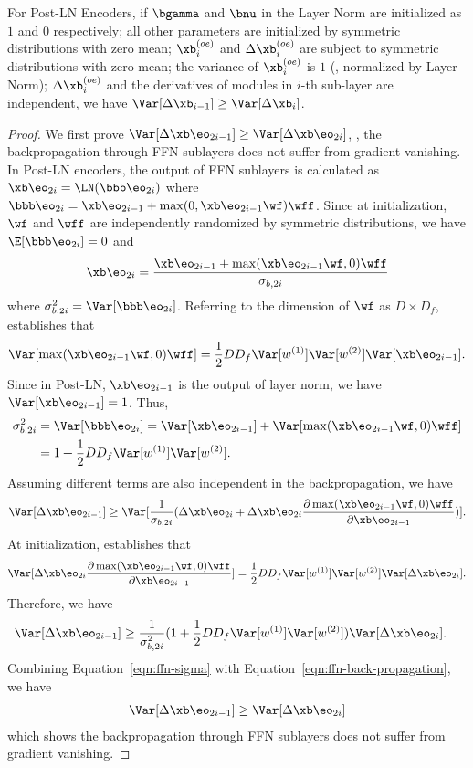 \begin{theorem}
For Post-LN Encoders, if $\bgamma$ and $\bnu$ in the Layer Norm are initialized as $1$ and $0$ respectively; all other parameters are initialized by symmetric distributions with zero mean; $\xb_{i}^{(oe)}$ and $\Delta \xb_i^{(oe)}$ are subject to symmetric distributions with zero mean; the variance of $\xb_{i}^{(oe)}$ is $1$ (\ie, normalized by Layer Norm); $\Delta \xb_i^{(oe)}$ and the derivatives of modules in $i$-th sub-layer are independent, we have $\Var[\Delta \xb_{i-1}] \geq \Var[\Delta \xb_{i}]$.
\end{theorem}
\begin{proof}
We first prove $\Var[\Delta \xb\eo_{2i-1}] \geq \Var[\Delta \xb\eo_{2i}]$, \ie, the backpropagation through FFN sublayers does not suffer from gradient vanishing. 
In Post-LN encoders, the output of FFN sublayers is calculated as $\xb\eo_{2i} = \LN(\bbb\eo_{2i})$ where $\bbb\eo_{2i} =
\xb\eo_{2i-1} + \max(0, \xb\eo_{2i-1}\wf)\wff$.
Since at initialization, $\wf$ and $\wff$ are independently randomized by symmetric distributions, we have $\E[\bbb\eo_{2i}] = 0$ and 
$$
\xb\eo_{2i} = \frac{\xb\eo_{2i-1} + \max(\xb\eo_{2i-1}\wf, 0)\wff}{\sigma_{b,2i}}
$$ 
where $\sigma_{b,2i}^2 = \Var[\bbb\eo_{2i}]$. 
Referring to the dimension of $\wf$ as $D \times D_f$, \citet{He2015DelvingDI} establishes that
$$
\Var[\max(\xb\eo_{2i-1}\wf, 0)\wff] = \frac{1}{2} D D_f \Var[w^{(1)}] \Var[w^{(2)}] \Var[\xb\eo_{2i-1}].
$$
Since in Post-LN, $\xb\eo_{2i-1}$ is the output of layer norm, we have $\Var[\xb\eo_{2i-1}] = 1$. 
Thus, 
\begin{align}
\sigma_{b,2i}^2 & = \Var[\bbb\eo_{2i}] = \Var[\xb\eo_{2i-1}] + \Var[\max(\xb\eo_{2i-1}\wf, 0)\wff] \nonumber\\
& = 1 + \frac{1}{2} D D_f \Var[w^{(1)}] \Var[w^{(2)}].
\label{eqn:ffn-sigma}
\end{align}
Assuming different terms are also independent in the backpropagation, we have
$$
\Var[\Delta \xb\eo_{2i-1}] \geq \Var[\frac{1}{\sigma_{b, 2i}} (\Delta \xb\eo_{2i} + \Delta \xb\eo_{2i} \frac{\partial \max(\xb\eo_{2i-1}\wf, 0)\wff}{\partial \xb\eo_{2i-1}})].
$$ 
At initialization, \citet{He2015DelvingDI} establishes that
$$
\Var[\Delta \xb\eo_{2i} \frac{\partial \max(\xb\eo_{2i-1}\wf, 0)\wff}{\partial \xb\eo_{2i-1}}] = \frac{1}{2} D D_f \Var[w^{(1)}] \Var[w^{(2)}] \Var[\Delta \xb\eo_{2i}].
$$
Therefore, we have
\begin{align}
\Var[\Delta \xb\eo_{2i-1}]& \geq  \frac{1}{\sigma^2_{b, 2i}} (1 + \frac{1}{2} D D_f \Var[w^{(1)}] \Var[w^{(2)}]) \Var[\Delta \xb\eo_{2i}].
\label{eqn:ffn-back-propagation}
\end{align}
Combining Equation~\ref{eqn:ffn-sigma} with Equation~\ref{eqn:ffn-back-propagation}, we have
\begin{align}
\Var[\Delta \xb\eo_{2i-1}] \geq \Var[\Delta \xb\eo_{2i}]
\label{eqn:ffn-no-vanish}
\end{align}
which shows the backpropagation through FFN sublayers does not suffer from gradient vanishing. 


\end{proof}

